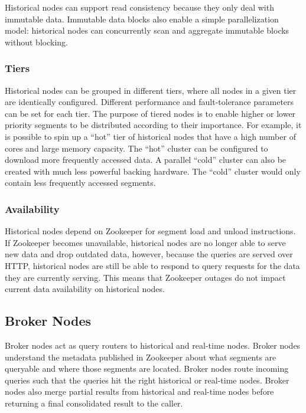 \documentclass{sig-alternate-2013}
\begin{document}
Historical nodes can support read consistency because they only deal with
immutable data. Immutable data blocks also enable a simple parallelization
model: historical nodes can concurrently scan and aggregate immutable blocks
without blocking.
 
\subsubsection{Tiers}
\label{sec:tiers}
Historical nodes can be grouped in different tiers, where all nodes in a
given tier are identically configured. Different performance and
fault-tolerance parameters can be set for each tier. The purpose of
tiered nodes is to enable higher or lower priority segments to be
distributed according to their importance. For example, it is possible
to spin up a “hot” tier of historical nodes that have a high number of
cores and large memory capacity. The “hot” cluster can be configured to
download more frequently accessed data. A parallel “cold” cluster
can also be created with much less powerful backing hardware. The
“cold” cluster would only contain less frequently accessed segments.

\subsubsection{Availability}
Historical nodes depend on Zookeeper for segment load and unload instructions.
If Zookeeper becomes unavailable, historical nodes are no longer able to serve
new data and drop outdated data, however, because the queries are served over
HTTP, historical nodes are still be able to respond to query requests for
the data they are currently serving. This means that Zookeeper outages do not
impact current data availability on historical nodes. 

\subsection{Broker Nodes}
Broker nodes act as query routers to historical and real-time nodes. Broker
nodes understand the metadata published in Zookeeper about what segments are
queryable and where those segments are located. Broker nodes route incoming queries
such that the queries hit the right historical or real-time nodes. Broker nodes
also merge partial results from historical and real-time nodes before returning
a final consolidated result to the caller.  
\end{document}
